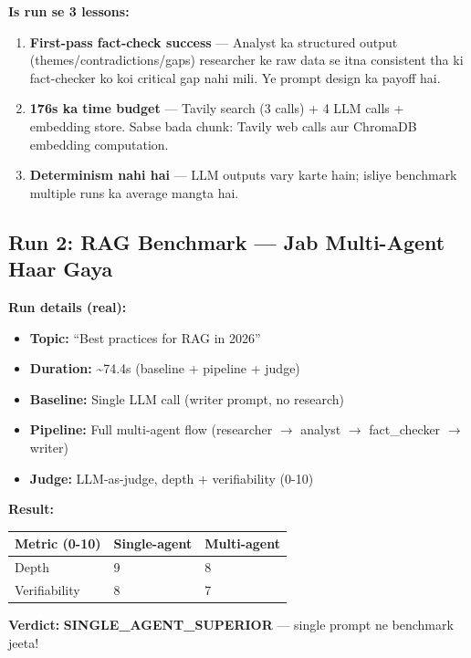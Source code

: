 \begin{conceptbox}
\textbf{Is run se 3 lessons:}
\begin{enumerate}[label=\arabic*.]
\item \textbf{First-pass fact-check success} --- Analyst ka structured output (themes/contradictions/gaps) researcher ke raw data se itna consistent tha ki fact-checker ko koi critical gap nahi mili. Ye prompt design ka payoff hai.
\item \textbf{176s ka time budget} --- Tavily search (3 calls) + 4 LLM calls + embedding store. Sabse bada chunk: Tavily web calls aur ChromaDB embedding computation.
\item \textbf{Determinism nahi hai} --- LLM outputs vary karte hain; isliye benchmark multiple runs ka average mangta hai.
\end{enumerate}
\end{conceptbox}

\subsection{Run 2: RAG Benchmark --- Jab Multi-Agent Haar Gaya}

\begin{codestorybox}
\textbf{Run details (real):}
\begin{itemize}
\item \textbf{Topic:} ``Best practices for RAG in 2026''
\item \textbf{Duration:} \textasciitilde74.4s (baseline + pipeline + judge)
\item \textbf{Baseline:} Single LLM call (writer prompt, no research)
\item \textbf{Pipeline:} Full multi-agent flow (researcher $\rightarrow$ analyst $\rightarrow$ fact\_checker $\rightarrow$ writer)
\item \textbf{Judge:} LLM-as-judge, depth + verifiability (0-10)
\end{itemize}

\textbf{Result:}
\begin{longtable}{p{5cm} p{3.5cm} p{3.5cm}}
\toprule
\textbf{Metric (0-10)} & \textbf{Single-agent} & \textbf{Multi-agent} \\
\midrule
Depth & 9 & 8 \\
Verifiability & 8 & 7 \\
\bottomrule
\end{longtable}

\textbf{Verdict:} \textbf{SINGLE\_AGENT\_SUPERIOR} --- single prompt ne benchmark jeeta!
\end{codestorybox}

